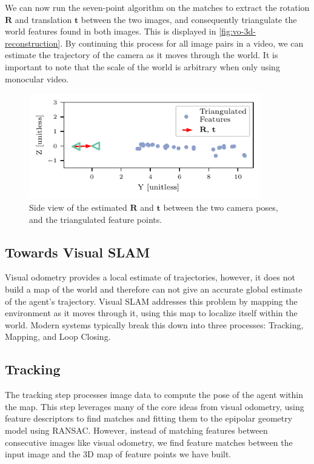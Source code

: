 We can now run the seven-point algorithm \autocite{Hartley2004} on the matches to extract the rotation $\mathbf{R}$ and translation $\mathbf{t}$ between the two images, and consequently triangulate the world features found in both images. This is displayed in \autoref{fig:vo-3d-reconstruction}. By continuing this process for all image pairs in a video, we can estimate the trajectory of the camera as it moves through the world. It is important to note that the scale of the world is arbitrary when only using monocular video.

\begin{figure}[h]
    \centering
    \begin{minipage}[t]{0.7\textwidth}
        \centering
        \includegraphics[width=0.9\textwidth]{figures/3d_reconstruction.pdf}
        \caption{Side view of the estimated $\mathbf{R}$ and $\mathbf{t}$ between the two camera poses, and the triangulated feature points.}
        \label{fig:vo-3d-reconstruction}
    \end{minipage}%
\end{figure}

\subsection{Towards Visual SLAM}
\label{sec:towards-visual-slam}
Visual odometry provides a local estimate of trajectories, however, it does not build a map of the world and therefore can not give an accurate global estimate of the agent's trajectory. Visual SLAM addresses this problem by mapping the environment as it moves through it, using this map to localize itself within the world. Modern systems typically break this down into three processes: Tracking, Mapping, and Loop Closing.

\subsection{Tracking}
\label{sec:visual-slam-tracking}
The tracking step processes image data to compute the pose of the agent within the map. This step leverages many of the core ideas from visual odometry, using feature descriptors to find matches and fitting them to the epipolar geometry model using RANSAC. However, instead of matching features between consecutive images like visual odometry, we find feature matches between the input image and the 3D map of feature points we have built.

